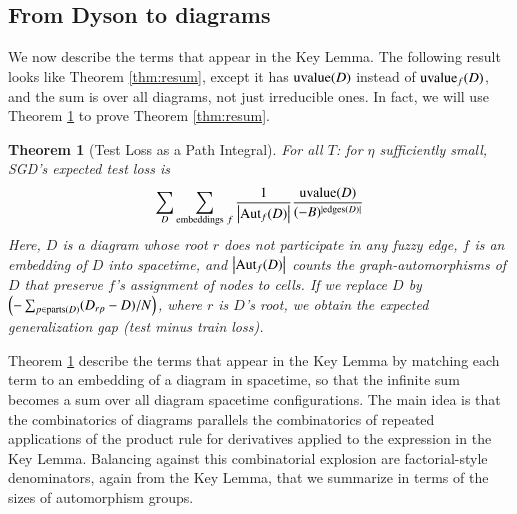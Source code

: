 \documentclass{article}
\theoremstyle{plain}
\newtheorem{thm}{Theorem}
\theoremstyle{definition}
\newcommand{\wrap}[1]{\left(#1\right)}
\newcommand{\wabs}[1]{\left|#1\right|}
\newcommand{\Aut}{\text{\textnormal{Aut}}}
\newcommand{\uvalue}{\text{\textnormal{uvalue}}}
\newcommand{\edges}{\text{\textnormal{edges}}}
\newcommand{\parts}{\text{\textnormal{parts}}}
\begin{document}
    \subsection{From Dyson to diagrams}                             \label{appendix:toward-diagrams}

        We now describe the terms that appear in the Key Lemma.  The following
        result looks like Theorem \ref{thm:resum}, except it has $\uvalue(D)$
        instead of $\uvalue_f(D)$, and the sum is over all diagrams, not just
        irreducible ones.  In fact, we will use Theorem \ref{thm:pathint} to
        prove Theorem \ref{thm:resum}.

        \begin{thm}[Test Loss as a Path Integral] \label{thm:pathint}
            For all $T$: for $\eta$ sufficiently small, SGD's expected test
            loss is
            \begin{equation*}\label{eq:sgdcoef}
                \sum_{D}
                    \sum_{\text{embeddings}~f}
                    \frac{1}{\wabs{\Aut_f(D)}}
                \frac{\uvalue(D)}{(-B)^{|\edges(D)|}}
            \end{equation*}
            Here, $D$ is a diagram whose root $r$ does not participate in
            any fuzzy edge, $f$ is an embedding of $D$ into spacetime, and
            $\wabs{\Aut_f(D)}$ counts the graph-automorphisms of $D$ that
            preserve $f$'s assignment of nodes to cells.
            If we replace $D$ by 
            $
                \wrap{-\sum_{p \in \parts(D)} (D_{rp} - D)/N}
            $, where $r$ is $D$'s root,
            we obtain the expected generalization gap (test minus train loss).
        \end{thm}

        Theorem \ref{thm:pathint} describe the terms that appear in the Key
        Lemma by matching each term to an embedding of a diagram in spacetime,
        so that the infinite sum becomes a sum over all diagram spacetime
        configurations.  The main idea is that the combinatorics of diagrams
        parallels the combinatorics of repeated applications of the product
        rule for derivatives applied to the expression in the Key Lemma.
        Balancing against this combinatorial explosion are factorial-style
        denominators, again from the Key Lemma, that we summarize in terms of
        the sizes of automorphism groups.
\end{document}
